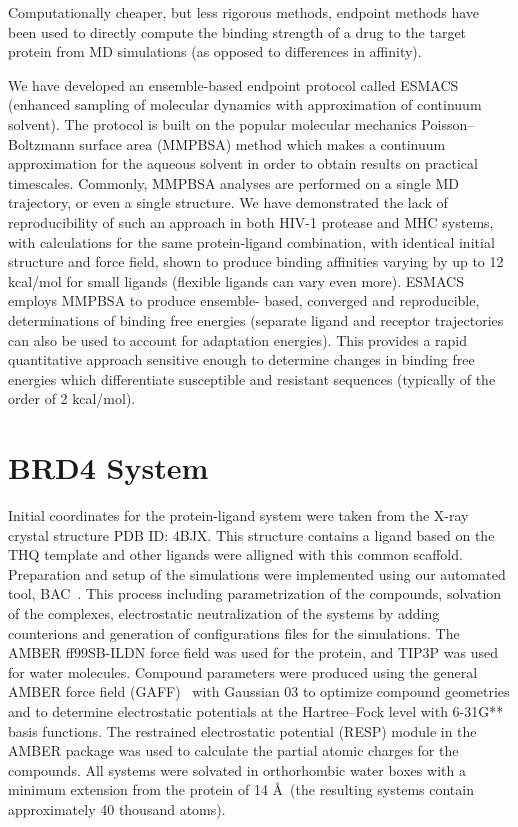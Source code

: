 \documentclass[conference]{IEEEtran}
\begin{document}
Computationally cheaper, but less rigorous methods, endpoint methods have been used to directly compute the binding strength of a drug to the target protein from MD simulations (as opposed to differences in affinity). 

We have developed an ensemble-based endpoint protocol called ESMACS (enhanced sampling of molecular dynamics with approximation of continuum solvent). The protocol is built on the popular molecular mechanics Poisson–Boltzmann surface area (MMPBSA) \cite{Massova1999} method which makes a continuum approximation for the aqueous solvent in order to obtain results on practical timescales. Commonly, MMPBSA analyses are performed on a single MD trajectory, or even a single structure. We have demonstrated the lack of reproducibility of such an approach in both HIV-1 protease and MHC systems, with calculations for the same protein-ligand combination, with identical initial structure and force field, shown to produce binding affinities varying by up to 12 kcal/mol for small ligands (flexible ligands can vary even more). \cite{Wan2015} ESMACS employs MMPBSA to produce ensemble- based, converged and reproducible, determinations of binding free energies (separate ligand and receptor trajectories can also be used to account for adaptation energies). This provides a rapid quantitative approach sensitive enough to determine changes in binding free energies which differentiate susceptible and resistant sequences (typically of the order of 2 kcal/mol).

\section{BRD4 System}\label{sec:system_description}

Initial coordinates for the protein-ligand system were taken from the X-ray
crystal structure PDB ID: 4BJX.
This structure contains a
ligand based on the THQ template and other ligands were alligned with this
common scaffold. Preparation and setup of the simulations were implemented
using our automated tool, BAC~\cite{Sadiq2008}. This process including
parametrization of the compounds, solvation of the complexes, electrostatic
neutralization of the systems by adding counterions and generation of
configurations files for the simulations. The AMBER ff99SB-ILDN
force field was used for the protein, and TIP3P was used
for water molecules. Compound parameters were produced using the general AMBER
force field (GAFF)~\cite{Wang2004} with Gaussian 03
to optimize compound geometries and to determine electrostatic potentials at
the Hartree–Fock level with 6-31G** basis functions. The restrained
electrostatic potential (RESP) module in the AMBER package
was used to calculate the partial atomic charges for the compounds. All systems
were solvated in orthorhombic water boxes with a minimum extension from the
protein of 14 \AA\ (the resulting systems contain approximately 40 thousand
atoms).
\end{document}
